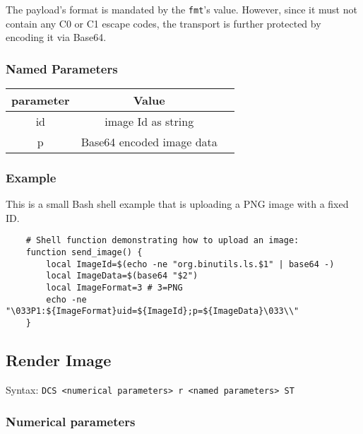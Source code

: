 \documentclass{article}
\newcommand{\code}[1]{\colorbox{light-gray}{\texttt{#1}}}
\begin{document}
The payload's format is mandated by the \code{fmt}'s value. However, since it must not contain
any C0 or C1 escape codes, the transport is further protected by encoding it via Base64.

\subsubsection*{Named Parameters}

\begin{tabular}{ |c|c|l| }
    \hline
    \textbf{parameter}   & \textbf{Value} \\
    \hline
    id          & image Id as string \\
    p           & Base64 encoded image data \\
    \hline
\end{tabular}

\subsubsection*{Example}

This is a small Bash shell example that is uploading a PNG image with a fixed ID.

\begin{verbatim}
    # Shell function demonstrating how to upload an image:
    function send_image() {
        local ImageId=$(echo -ne "org.binutils.ls.$1" | base64 -)
        local ImageData=$(base64 "$2")
        local ImageFormat=3 # 3=PNG
        echo -ne "\033P1:${ImageFormat}uid=${ImageId};p=${ImageData}\033\\"
    }
\end{verbatim}

\subsection{Render Image}

Syntax: \code{DCS <numerical parameters> r <named parameters> ST}

\subsubsection*{Numerical parameters}
\end{document}

